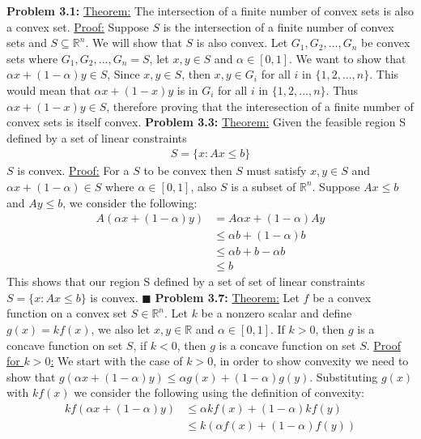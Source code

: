\documentclass{article}
\begin{document}
\break \break
\textbf{Problem 3.1:} \underline{Theorem:} The intersection of a finite number of convex sets is also a convex set.
\newline \underline{Proof:} Suppose $S$ is the intersection of a finite number of convex sets and $S \subseteq \mathbb{R}^n$. We will show that $S$ is also convex. Let $G_1, G_2, ... , G_n$ be convex sets where $G_1, G_2, ... , G_n = S$, let $x, y \in S$ and $\alpha \in [0,1]$. We want to show that $\alpha x + (1-\alpha)y \in S$, Since $x,y \in S$, then $x,y \in G_i$ for all $i$ in $ \{1, 2, ..., n\} $. This would mean that $\alpha x + (1 - x)y$ is in $G_i$ for all $i$ in $\{1,2,...,n\}$. Thus $\alpha x + (1 - x)y \in S$, therefore proving that the interesection of a finite number of convex sets is itself convex.
\break
\break
\textbf{Problem 3.3:} \underline{Theorem:} Given the feasible region S defined by a set of linear constraints
\begin{align*}
    S = \{ x : Ax \leq b \}
\end{align*}
$S$ is convex.
\newline \underline{Proof:} For a $S$ to be convex then $S$ must satisfy $x,y \in S$ and $\alpha x + (1 - \alpha) \in S$ where $\alpha \in [0,1]$, also $S$ is a subset of $\mathbb{R}^n$.  Suppose $Ax \leq b$ and $Ay \leq b$, we consider the following:
\begin{align*}
    A(\alpha x + (1 - \alpha)y) & = A\alpha x + (1 - \alpha)Ay \\
    & \leq \alpha b + (1 - \alpha)b \\
    & \leq \alpha b + b - \alpha b \\
    & \leq b 
\end{align*}
This shows that our region S defined by a set of set of linear constraints $S = \{ x : Ax \leq b \}$ is convex. $\blacksquare$
\break
\break
\textbf{Problem 3.7:} \underline{Theorem:} Let $f$ be a convex function on a convex set $S \in \mathbb{R}^n$. Let $k$ be a nonzero scalar and define $g(x) = kf(x)$, we also let $x,y \in \mathbb{R}$ and $\alpha \in [0,1]$. If  $k > 0$, then $g$ is a concave function on set $S$, if $k < 0$, then $g$ is a concave function on set $S$.
\newline \underline{Proof for $k > 0$:} We start with the case of $k > 0$, in order to show convexity we need to show that $g(\alpha x + (1 - \alpha)y)  \leq \alpha g(x) + (1 - \alpha)g(y)$. Substituting $g(x)$ with $kf(x)$ we consider the following using the definition of convexity:
\begin{align*}
    kf(\alpha x + (1 - \alpha)y) & \leq \alpha kf(x) + (1 - \alpha)kf(y) \\ 
    & \leq k(\alpha f(x) + (1 - \alpha)f(y)) 
\end{align*}
\end{document}
